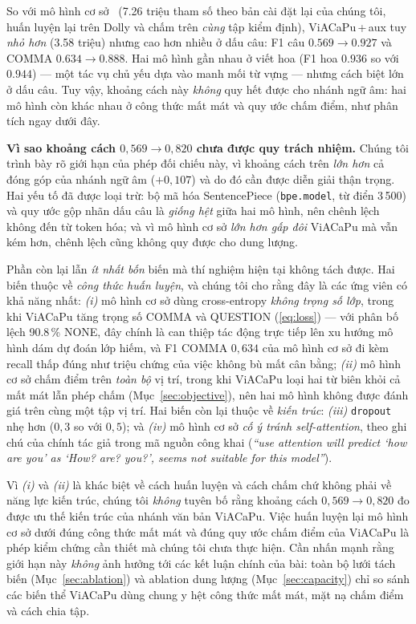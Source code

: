 \documentclass[conference,onecolumn]{IEEEtran}
\begin{document}
So với mô hình cơ sở~\cite{you2024lightweight} (7.26 triệu tham số theo bản cài đặt
lại của chúng tôi, huấn luyện lại trên Dolly và chấm trên \emph{cùng} tập kiểm
định), ViACaPu\,+\,aux tuy \emph{nhỏ hơn} (3.58 triệu) nhưng cao hơn nhiều ở dấu
câu: F1 câu $0.569 \to 0.927$ và COMMA $0.634 \to 0.888$. Hai mô hình gần nhau ở
viết hoa (F1 hoa $0.936$ so với $0.944$) --- một tác vụ chủ yếu dựa vào manh mối
từ vựng --- nhưng cách biệt lớn ở dấu câu. Tuy vậy, khoảng cách này \emph{không}
quy hết được cho nhánh ngữ âm: hai mô hình còn khác nhau ở công thức mất mát và
quy ước chấm điểm, như phân tích ngay dưới đây.

\textbf{Vì sao khoảng cách $0{,}569 \to 0{,}820$ chưa được quy trách nhiệm.}
Chúng tôi trình bày rõ giới hạn của phép đối chiếu này, vì khoảng cách trên
\emph{lớn hơn} cả đóng góp của nhánh ngữ âm ($+0{,}107$) và do đó cần được
diễn giải thận trọng. Hai yếu tố đã được loại trừ: bộ mã hóa SentencePiece
(\texttt{bpe.model}, từ điển 3\,500) và quy ước gộp nhãn dấu câu là
\emph{giống hệt} giữa hai mô hình, nên chênh lệch không đến từ token hóa; và
vì mô hình cơ sở \emph{lớn hơn gấp đôi} ViACaPu mà vẫn kém hơn, chênh lệch
cũng không quy được cho dung lượng.

Phần còn lại lẫn \emph{ít nhất bốn} biến mà thí nghiệm hiện tại không tách
được. Hai biến thuộc về \emph{công thức huấn luyện}, và chúng tôi cho rằng đây
là các ứng viên có khả năng nhất: \emph{(i)} mô hình cơ sở dùng cross-entropy
\emph{không trọng số lớp}, trong khi ViACaPu tăng trọng số COMMA và QUESTION
(\eqref{eq:loss}) --- với phân bố lệch 90.8\,\% NONE, đây chính là can thiệp
tác động trực tiếp lên xu hướng mô hình dám dự đoán lớp hiếm, và F1 COMMA
$0{,}634$ của mô hình cơ sở đi kèm recall thấp đúng như triệu chứng của việc
không bù mất cân bằng; \emph{(ii)} mô hình cơ sở chấm điểm trên \emph{toàn bộ}
vị trí, trong khi ViACaPu loại hai từ biên khỏi cả mất mát lẫn phép chấm
(Mục~\ref{sec:objective}), nên hai mô hình không được đánh giá trên cùng một
tập vị trí. Hai biến còn lại thuộc về \emph{kiến trúc}: \emph{(iii)}
\texttt{dropout} nhẹ hơn ($0{,}3$ so với $0{,}5$); và \emph{(iv)} mô hình cơ
sở \emph{cố ý tránh self-attention}, theo ghi chú của chính tác giả trong mã
nguồn công khai (\textit{``use attention will predict `how are you' as `How?
are? you?', seems not suitable for this model''}).

Vì \emph{(i)} và \emph{(ii)} là khác biệt về cách huấn luyện và cách chấm chứ
không phải về năng lực kiến trúc, chúng tôi \emph{không} tuyên bố rằng khoảng
cách $0{,}569 \to 0{,}820$ đo được ưu thế kiến trúc của nhánh văn bản ViACaPu.
Việc huấn luyện lại mô hình cơ sở dưới đúng công thức mất mát và đúng quy ước
chấm điểm của ViACaPu là phép kiểm chứng cần thiết mà chúng tôi chưa thực
hiện. Cần nhấn mạnh rằng giới hạn này \emph{không} ảnh hưởng tới các kết luận
chính của bài: toàn bộ lưới tách biến (Mục~\ref{sec:ablation}) và ablation
dung lượng (Mục~\ref{sec:capacity}) chỉ so sánh các biến thể ViACaPu dùng
chung y hệt công thức mất mát, mặt nạ chấm điểm và cách chia tập.
\end{document}
